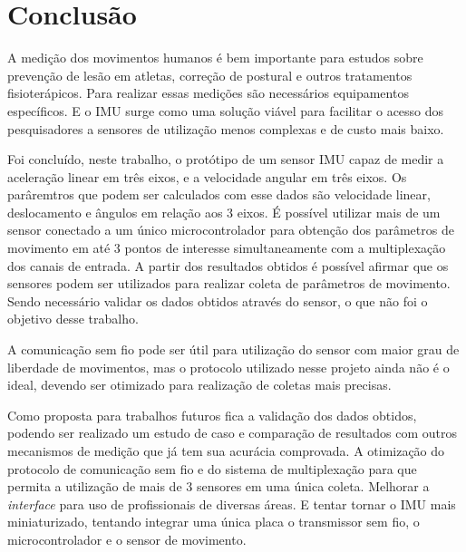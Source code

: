 \chapter{Conclusão}
	
	A medição dos movimentos  humanos é bem importante para estudos sobre prevenção de lesão em atletas, correção de postural e outros tratamentos fisioterápicos. Para realizar essas medições são necessários equipamentos específicos. E o IMU surge como uma solução viável para facilitar o acesso dos pesquisadores a sensores de utilização menos complexas e de custo mais baixo. 
	
	Foi concluído, neste trabalho, o protótipo de um sensor IMU capaz de medir a aceleração linear em três eixos, e a velocidade angular em três eixos. Os parâremtros que podem ser calculados com esse dados são velocidade linear, deslocamento e ângulos em relação aos 3 eixos. É possível utilizar mais de um sensor conectado a um único microcontrolador para obtenção dos parâmetros de movimento em até 3 pontos de interesse simultaneamente com a multiplexação dos canais de entrada. A partir dos resultados obtidos é possível afirmar que os sensores podem ser utilizados para realizar coleta de parâmetros de movimento. Sendo necessário validar os dados obtidos através do sensor, o que não foi o objetivo desse trabalho.
	
	A comunicação sem fio pode ser útil para utilização do sensor com maior grau de liberdade de movimentos, mas o protocolo utilizado nesse projeto ainda não é o ideal, devendo ser otimizado para realização de coletas mais precisas. 
	
	Como proposta para trabalhos futuros fica a validação dos dados obtidos, podendo ser realizado um estudo de caso e comparação de resultados com outros mecanismos de medição que já tem sua acurácia comprovada. A otimização do protocolo de comunicação sem fio e do sistema de multiplexação para que permita a utilização de mais de 3 sensores em uma única coleta. Melhorar a \textit{interface}  para uso de profissionais de diversas áreas. E tentar tornar o IMU mais miniaturizado, tentando integrar uma única placa o transmissor sem fio, o microcontrolador e o sensor de movimento.